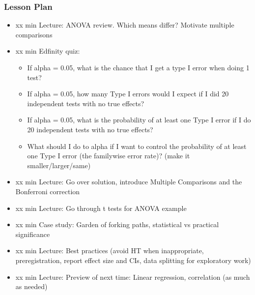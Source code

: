 \begin{frame}
    \frametitle{Lesson Plan}
    \begin{itemize}
        \item xx min Lecture: ANOVA review. Which means differ? Motivate multiple comparisons
        \item xx min Edfinity quiz:
        \begin{itemize}
            \item If alpha = 0.05, what is the chance that I get a type I error when doing 1 test?
            \item If alpha = 0.05, how many Type I errors would I expect if I did 20 independent tests with no true effects?
            \item If alpha = 0.05, what is the probability of at least one Type I error if I do 20 independent tests with no true effects?
            \item What should I do to alpha if I want to control the probability of at least one Type I error (the familywise error rate)? (make it smaller/larger/same)
        \end{itemize}
        \item xx min Lecture: Go over solution, introduce Multiple Comparisons and the Bonferroni correction
        \item xx min Lecture: Go through t tests for ANOVA example
        \item xx min Case study: Garden of forking paths, statistical vs practical significance
        \item xx min Lecture: Best practices (avoid HT when inappropriate, preregistration, report effect size and CIs, data splitting for exploratory work)
        \item xx min Lecture: Preview of next time: Linear regression, correlation (as much as needed)
    \end{itemize}
\end{frame}

    
